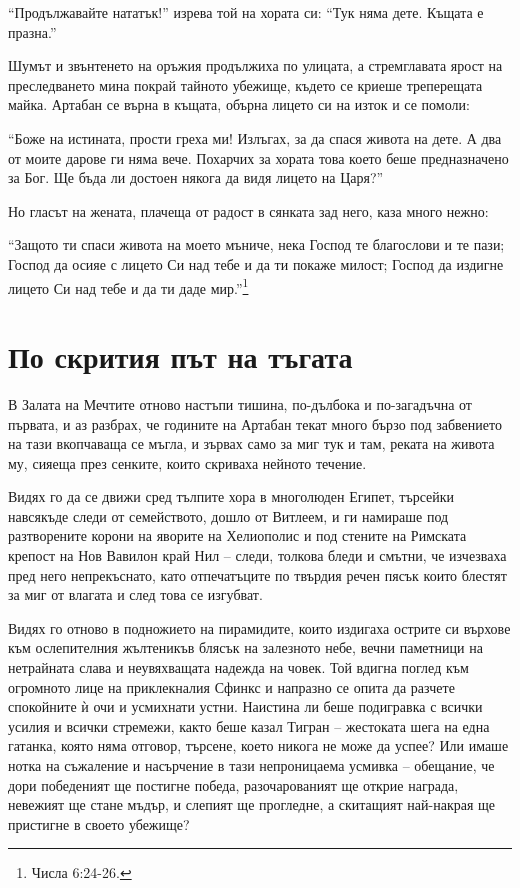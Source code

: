 \documentclass[oneside,10pt]{memoir}
\begin{document}
``Продължавайте нататък!'' изрева той на хората си: ``Тук няма дете. Къщата е
празна.''

Шумът и звънтенето на оръжия продължиха по улицата, а стремглавата ярост на
преследването мина покрай тайното убежище, където се криеше треперещата майка.
Артабан се върна в къщата, обърна лицето си на изток и се помоли:

``Боже на истината, прости греха ми! Излъгах, за да спася живота на дете. А два
от моите дарове ги няма вече. Похарчих за хората това което беше предназначено
за Бог. Ще бъда ли достоен някога да видя лицето на Царя?''

Но гласът на жената, плачеща от радост в сянката зад него, каза много нежно:

``Защото ти спаси живота на моето мъниче, нека Господ те благослови и те пази;
Господ да осияе с лицето Си над тебе и да ти покаже милост; Господ да издигне
лицето Си над тебе и да ти даде мир.''\footnote{Числа 6:24-26.}

\part{По скрития път на тъгата}

В Залата на Мечтите отново настъпи тишина, по-дълбока и по-загадъчна от първата,
и аз разбрах, че годините на Артабан текат много бързо под забвението на тази
вкопчаваща се мъгла, и зървах само за миг тук и там, реката на живота му, сияеща
през сенките, които скриваха нейното течение.

Видях го да се движи сред тълпите хора в многолюден Египет, търсейки навсякъде
следи от семейството, дошло от Витлеем, и ги намираше под разтворените корони на
яворите на Хелиополис и под стените на Римската крепост на Нов Вавилон край Нил
-- следи, толкова бледи и смътни, че изчезваха пред него непрекъснато, като
отпечатъците по твърдия речен пясък които блестят за миг от влагата и след това
се изгубват.

Видях го отново в подножието на пирамидите, които издигаха острите си върхове
към ослепителния жълтеникъв блясък на залезното небе, вечни паметници на
нетрайната слава и неувяхващата надежда на човек. Той вдигна поглед към
огромното лице на приклекналия Сфинкс и напразно се опита да разчете спокойните
ѝ очи и усмихнати устни. Наистина ли беше подигравка с всички усилия и всички
стремежи, както беше казал Тигран -- жестоката шега на една гатанка, която няма
отговор, търсене, което никога не може да успее? Или имаше нотка на съжаление и
насърчение в тази непроницаема усмивка -- обещание, че дори победеният ще
постигне победа, разочарованият ще открие награда, невежият ще стане мъдър, и
слепият ще прогледне, а скитащият най-накрая ще пристигне в своето убежище?
\end{document}
